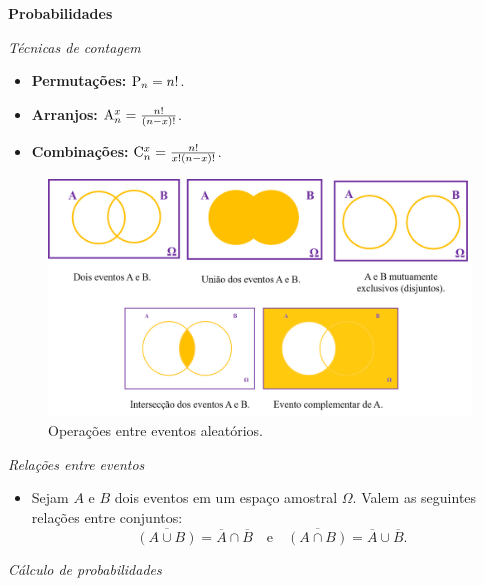 \documentclass[10pt]{article}%
\begin{document}
\textbf{Probabilidades}

\emph{Técnicas de contagem}

\begin{itemize}%
\item \textbf{Permutações:} ${\rm P}_n = n!$.
\item \textbf{Arranjos:} ${\rm A}_n^x = \frac{n!}{(n-x)!}$.
\item \textbf{Combinações:} ${\rm C}_n^x = \frac{n!}{x!(n-x)!}$.
\end{itemize}

\begin{figure}[!ht]
\centering
\includegraphics[width=0.8\columnwidth]{eventos_relacoes.png}
\caption{Operações entre eventos aleatórios.}
\end{figure}

\emph{Relações entre eventos}

\begin{itemize}%
\item Sejam $A$ e $B$ dois eventos em um espaço amostral $\Omega$. Valem as seguintes relações entre conjuntos:%
$$
\overline{(A\cup B)} = \overline{A} \cap \overline{B}\quad \mbox{e}\quad \overline{(A\cap B)} = \overline{A} \cup \overline{B}.
$$
\end{itemize}

\emph{Cálculo de probabilidades}
\end{document}
